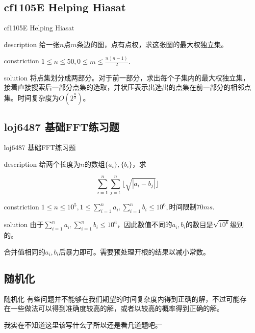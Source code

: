 \documentclass{beamer}
\begin{document}
	\subsection{cf1105E Helping Hiasat}
	\begin{frame}{cf1105E Helping Hiasat}
		\begin{block}{description}
			给一张$n$点$m$条边的图，点有点权，求这张图的最大权独立集。
		\end{block}
		\begin{block}{constriction}
			$1 \le n \le 50, 0 \le m \le \frac{n(n-1)}{2}.$
		\end{block}
		\pause
		\begin{block}{solution}
			将点集划分成两部分。对于前一部分，求出每个子集内的最大权独立集，接着直接搜索后一部分点集的选取，并状压表示出选出的点集在前一部分的相邻点集。时间复杂度为$O(2^{\frac{n}{2}})$。
		\end{block}
	\end{frame}	
	\subsection{loj6487 基础FFT练习题}
	\begin{frame}{loj6487 基础FFT练习题}
		\begin{block}{description}
			给两个长度为$n$的数组$\{a_i\},\{b_i\}$，求
			
			$$\sum_{i=1}^n\sum_{j=1}^n\lfloor\sqrt{|a_i-b_j|}\rfloor$$
		\end{block}
		\begin{block}{constriction}
			$1 \le n \le 10^5, 1 \le \sum_{i=1}^na_i, \sum_{i=1}^nb_i \le 10^6,$时间限制$70ms.$
		\end{block}
		\pause
		\begin{block}{solution}
			由于$\sum_{i=1}^na_i, \sum_{i=1}^nb_i \le 10^6$，因此数值不同的$a_i,b_i$的数目是$\sqrt{10^6}$级别的。
			
			合并值相同的$a_i,b_i$后暴力即可。需要预处理开根的结果以减小常数。
		\end{block}
	\end{frame}
	\subsection{随机化}
	\begin{frame}{随机化}
		有些问题并不能够在我们期望的时间复杂度内得到正确的解，不过可能存在一些做法可以得到准确度较高的解，或者以较高的概率得到正确的解。
		
		\sout{我实在不知道这里该写什么了所以还是看几道题吧。}
	\end{frame}
\end{document}

